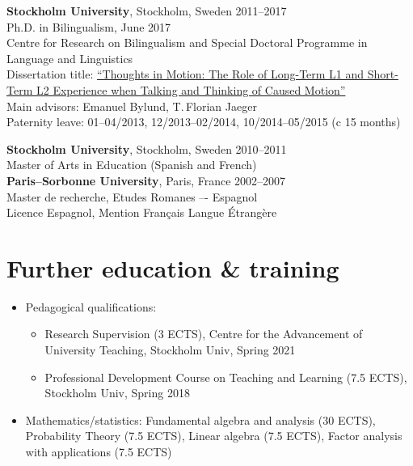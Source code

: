 \documentclass[margin, 11pt]{res} %
\begin{document}
\begin{resume}
{\bf Stockholm University}, Stockholm, Sweden \hfill 2011--2017\\
Ph.D. in Bilingualism, June 2017
\vspace*{.05in}\\
Centre for Research on Bilingualism and Special Doctoral Programme in Language and Linguistics
\vspace*{.05in}\\
Dissertation title:  \href{http://su.diva-portal.org/smash/record.jsf?pid=diva2:1092276}{``Thoughts in Motion: The Role of Long-Term L1 and Short-Term L2 Experience when Talking and Thinking of Caused Motion''}
\vspace*{.05in}\\
Main advisors:  Emanuel Bylund, T.\,Florian Jaeger
\vspace*{.05in}\\
\textcolor{mygray}{Paternity leave: 01--04/2013, 12/2013--02/2014, 10/2014--05/2015 (c 15 months)}

{\bf Stockholm University}, Stockholm, Sweden \hfill 2010--2011\\
Master of Arts in Education (Spanish and French)\\

\vspace*{-.1in}
{\bf Paris--Sorbonne University}, Paris, France \hfill 2002--2007\\
Master de recherche, Etudes Romanes –- Espagnol \\
Licence Espagnol, Mention Fran\c{c}ais Langue \'{E}trang\`{e}re \\
 

\section{\sc Further education \& training}

\begin{itemize}

\item Pedagogical qualifications:
	\begin{itemize}
	\item Research Supervision (3 ECTS), Centre for the Advancement of University Teaching, Stockholm Univ, Spring 2021
	\item Professional Development Course on Teaching and Learning (7.5 ECTS), Stockholm Univ, Spring 2018
	\end{itemize}

\item Mathematics/statistics: 
Fundamental algebra and analysis (30 ECTS), Probability Theory (7.5 ECTS), Linear algebra (7.5 ECTS), Factor analysis with applications (7.5 ECTS)


\end{itemize}
\end{resume}
\end{document}
